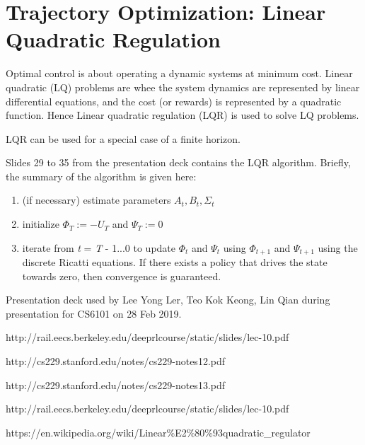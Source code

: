 \documentclass{article}
\begin{document}
\section{Trajectory Optimization: Linear Quadratic Regulation}
Optimal control is about operating a dynamic systems at minimum cost. Linear quadratic (LQ) problems are whee the system dynamics are represented by linear differential equations, and the cost (or rewards) is represented by a quadratic function. Hence Linear quadratic regulation (LQR) is used to solve LQ problems.

LQR can be used for a special case of a finite horizon.

Slides 29 to 35 from the presentation deck contains the LQR algorithm. Briefly, the summary of the algorithm is given here:
\begin{enumerate}
    \item (if necessary) estimate parameters $\textit{A}_t, \textit{B}_t,\Sigma_t$
    
    \item initialize $\Phi_T := -\textit{U}_T$ and $\Psi_T:=0$
    
    \item iterate from \textit{t} = \textit{T} - 1...0 to update $\Phi_t$ and $\Psi_t$ using $\Phi_{t+1}$ and $\Psi_{t+1}$ using the discrete Ricatti equations. If there exists a policy that drives the state towards zero, then convergence is guaranteed.
    
\end{enumerate}



\small



Presentation deck used by Lee Yong Ler, Teo Kok Keong, Lin Qian during presentation for CS6101 on 28 Feb 2019.

http://rail.eecs.berkeley.edu/deeprlcourse/static/slides/lec-10.pdf

http://cs229.stanford.edu/notes/cs229-notes12.pdf

http://cs229.stanford.edu/notes/cs229-notes13.pdf

http://rail.eecs.berkeley.edu/deeprlcourse/static/slides/lec-10.pdf

https://en.wikipedia.org/wiki/Linear\%E2\%80\%93quadratic\_regulator
\end{document}
